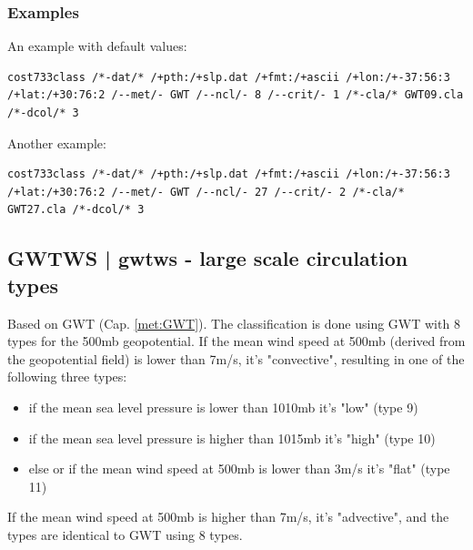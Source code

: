 \documentclass[12pt, oneside, a4paper, headsepline, plainheadsepline]{scrbook}
\begin{document}
\subsubsection*{Examples}
An example with default values:
\begin{lstlisting}
cost733class /*-dat/* /+pth:/+slp.dat /+fmt:/+ascii /+lon:/+-37:56:3 /+lat:/+30:76:2 /--met/- GWT /--ncl/- 8 /--crit/- 1 /*-cla/* GWT09.cla /*-dcol/* 3 
\end{lstlisting}
Another example:
\begin{lstlisting}
cost733class /*-dat/* /+pth:/+slp.dat /+fmt:/+ascii /+lon:/+-37:56:3 /+lat:/+30:76:2 /--met/- GWT /--ncl/- 27 /--crit/- 2 /*-cla/* GWT27.cla /*-dcol/* 3 
\end{lstlisting}


\subsection{GWTWS | gwtws - large scale circulation types}

Based on GWT (Cap. \ref{met:GWT}). The classification is done using GWT with 8 types for the 500mb geopotential.
If the mean wind speed at 500mb (derived from the geopotential field) is lower than 7m/s, it's "convective", resulting in one of the following three types:
\begin{itemize}
\item if the mean sea level pressure is lower than 1010mb it's "low" (type 9)
\item if the mean sea level pressure is higher than 1015mb it's "high" (type 10)
\item else or if the mean wind speed at 500mb is lower than 3m/s it's "flat" (type 11)
\end{itemize}
If the mean wind speed at 500mb is higher than 7m/s, it's "advective", and the types are identical to GWT using 8 types.
\end{document}
